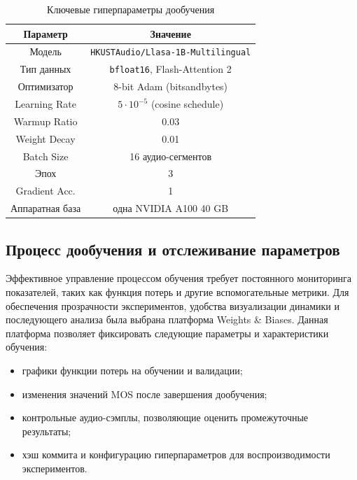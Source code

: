 \begin{table}[h!]
\centering
  \begin{tabular}{|c|c|}
    \hline
    Параметр & Значение \\
    \hline
    Модель & \texttt{HKUSTAudio/Llasa-1B-Multilingual} \\
    \hline
    Тип данных & \texttt{bfloat16}, Flash-Attention 2 \\
    \hline
    Оптимизатор & 8-bit Adam (bitsandbytes) \\
    \hline
    Learning Rate & $5\!\cdot\!10^{-5}$ (cosine schedule) \\
    \hline
    Warmup Ratio & 0.03 \\
    \hline
    Weight Decay & 0.01 \\
    \hline
    Batch Size & 16 аудио-сегментов \\
    \hline
    Эпох & 3 \\
    \hline
    Gradient Acc. & 1 \\
    \hline
    Аппаратная база & одна NVIDIA A100 40 GB \\ 
    \hline
  \end{tabular}
  \caption{Ключевые гиперпараметры дообучения}
  \label{tab:ft_hparams}
\end{table}

\subsection{Процесс дообучения и отслеживание параметров}

Эффективное управление процессом обучения требует постоянного мониторинга показателей, таких как  
функция потерь и другие вспомогательные метрики. Для обеспечения прозрачности экспериментов,  
удобства визуализации динамики и последующего анализа была выбрана платформа Weights \& Biases.  
Данная платформа позволяет фиксировать следующие параметры и характеристики обучения:

\begin{itemize}
  \item графики функции потерь на обучении и валидации;  
  \item изменения значений MOS после завершения дообучения;  
  \item контрольные аудио-сэмплы, позволяющие оценить промежуточные результаты;  
  \item хэш коммита и конфигурацию гиперпараметров для воспроизводимости экспериментов.  
\end{itemize}

